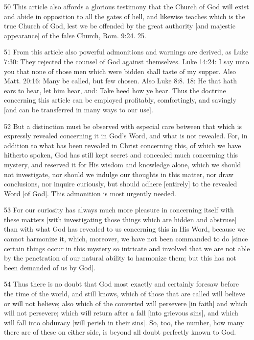 {50 This article also affords a glorious testimony that the Church of God will exist and abide in opposition to all the gates of hell, and likewise teaches which is the true Church of God, lest we be offended by the great authority [and majestic appearance] of the false Church, Rom. 9:24. 25.

51 From this article also powerful admonitions and warnings are derived, as Luke 7:30: They rejected the counsel of God against themselves. Luke 14:24: I say unto you that none of those men which were bidden shall taste of my supper. Also Matt. 20:16: Many be called, but few chosen. Also Luke 8:8. 18: He that hath ears to hear, let him hear, and: Take heed how ye hear. Thus the doctrine concerning this article can be employed profitably, comfortingly, and savingly [and can be transferred in many ways to our use].

52 But a distinction must be observed with especial care between that which is expressly revealed concerning it in God’s Word, and what is not revealed. For, in addition to what has been revealed in Christ concerning this, of which we have hitherto spoken, God has still kept secret and concealed much concerning this mystery, and reserved it for His wisdom and knowledge alone, which we should not investigate, nor should we indulge our thoughts in this matter, nor draw conclusions, nor inquire curiously, but should adhere [entirely] to the revealed Word [of God]. This admonition is most urgently needed.

53 For our curiosity has always much more pleasure in concerning itself with these matters [with investigating those things which are hidden and abstruse] than with what God has revealed to us concerning this in His Word, because we cannot harmonize it, which, moreover, we have not been commanded to do [since certain things occur in this mystery so intricate and involved that we are not able by the penetration of our natural ability to harmonize them; but this has not been demanded of us by God].

54 Thus there is no doubt that God most exactly and certainly foresaw before the time of the world, and still knows, which of those that are called will believe or will not believe; also which of the converted will persevere [in faith] and which will not persevere; which will return after a fall [into grievous sins], and which will fall into obduracy [will perish in their sins]. So, too, the number, how many there are of these on either side, is beyond all doubt perfectly known to God.

}
